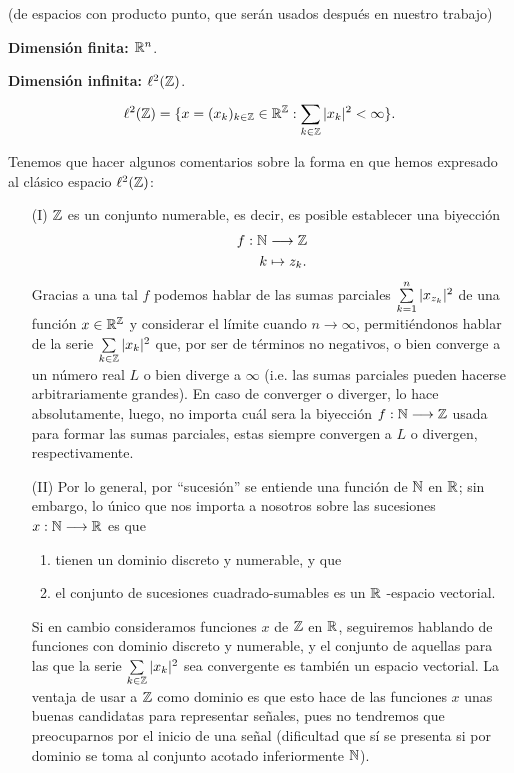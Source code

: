 \begin{ej} \label{ej: espacios con producto punto Rn y ell}
(de espacios con producto punto, que serán usados después en nuestro trabajo)

\textbf{Dimensión finita: $\mathbb{R}^{n}$}. 

\textbf{Dimensión infinita: $\ell^{2}(\mathbb{Z})$}. 
\[
\ell^{2}(\mathbb{Z}) = \{ x=(x_{k})_{k \in \mathbb{Z}} \in \mathbb{R}^{\mathbb{Z}} :
\sum\limits_{k \in \mathbb{Z}}^{}|x_{k}|^{2} < \infty\}.
 \]
 
Tenemos que hacer algunos comentarios sobre la forma
en que hemos expresado al clásico espacio $\ell^{2}(\mathbb{Z})$:

\begin{itemize}
	\item[(I)] $\mathbb{Z}$ es un conjunto numerable,
	es decir, es posible establecer una biyección
	\[
	\begin{split}
	f: \mathbb{N} & \longrightarrow \mathbb{Z} \\
	k & \mapsto z_{k}.
	\end{split}
	\]
	Gracias a una tal $f$ podemos hablar de las sumas
	parciales $\sum\limits_{k=1}^{n}|x_{z_{k}}|^{2}$ de una
	función $x \in \mathbb{R}^{\mathbb{Z}}$ y considerar el límite cuando 
	$n \rightarrow \infty $, permitiéndonos hablar de
	la serie $\sum\limits_{k \in \mathbb{Z}}^{}|x_{k}|^{2}$ que,
	por ser de términos no negativos, o bien converge a un 
	número real $L$ o bien diverge a $\infty$ (i.e. las sumas
	parciales pueden hacerse arbitrariamente grandes).
	En caso de converger o diverger, lo hace absolutamente, 
	luego, no importa cuál sera la biyección 
	$f: \mathbb{N} \longrightarrow \mathbb{Z}$ usada para formar
	las sumas parciales, estas siempre convergen a $L$
	o divergen, respectivamente. 
	
	\item[(II)] Por lo general, por ``sucesión'' se 
	entiende una función de $\mathbb{N}$ en $\mathbb{R}$; sin embargo, lo único 
	que nos importa a nosotros sobre las sucesiones 
	$x: \mathbb{N} \longrightarrow \mathbb{R}$ es que
	\begin{enumerate}
		\item tienen un dominio discreto y numerable, y que
		\item el conjunto de sucesiones cuadrado-sumables
		es un $\mathbb{R}$ -espacio vectorial. 
	\end{enumerate}
	Si en cambio consideramos funciones $x$ de
	$\mathbb{Z}$ en $\mathbb{R}$, seguiremos hablando de funciones
	con dominio discreto y numerable, y el conjunto
	de aquellas para las que la serie 
	$\sum\limits_{k \in \mathbb{Z}}^{}|x_{k}|^{2} $ sea convergente
	es también un espacio vectorial. La ventaja de usar
	a $\mathbb{Z}$ como dominio es que esto hace de las funciones
	$x$ unas buenas candidatas para representar señales,
	pues no tendremos que preocuparnos por el inicio de
	una señal (dificultad que sí se presenta si por dominio
	se toma al conjunto acotado inferiormente $\mathbb{N}$).
\end{itemize}




\end{ej}
